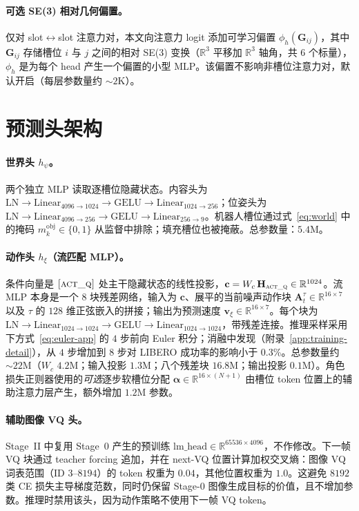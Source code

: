 \paragraph{可选 SE(3) 相对几何偏置。}
仅对 slot$\leftrightarrow$slot 注意力对，本文向注意力 logit 添加可学习偏置 $\phi_h(\mathbf{G}_{ij})$，其中 $\mathbf{G}_{ij}$ 存储槽位 $i$ 与 $j$ 之间的相对 SE(3) 变换（$\mathbb{R}^3$ 平移加 $\mathbb{R}^3$ 轴角，共 $6$ 个标量），$\phi_h$ 是为每个 head 产生一个偏置的小型 MLP。该偏置不影响非槽位注意力对，默认开启（每层参数量约 $\sim\!2$K）。

\section{预测头架构}
\label{app:heads}

\paragraph{世界头 $h_\psi$。}
两个独立 MLP 读取逐槽位隐藏状态。内容头为 $\mathrm{LN}\!\to\!\mathrm{Linear}_{4096\to 1024}\!\to\!\mathrm{GELU}\!\to\!\mathrm{Linear}_{1024\to 256}$；位姿头为 $\mathrm{LN}\!\to\!\mathrm{Linear}_{4096\to 256}\!\to\!\mathrm{GELU}\!\to\!\mathrm{Linear}_{256\to 9}$。机器人槽位通过式~\eqref{eq:world} 中的掩码 $m_k^\mathrm{obj}\!\in\!\{0,1\}$ 从监督中排除；填充槽位也被掩蔽。总参数量：$5.4$M。

\paragraph{动作头 $h_\xi$（流匹配 MLP）。}
条件向量是 $\textsc{[act\_q]}$ 处主干隐藏状态的线性投影，$\mathbf{c}=W_c\,\mathbf{H}_{\textsc{act\_q}}\in\mathbb{R}^{1024}$。流 MLP 本身是一个 $8$ 块残差网络，输入为 $\mathbf{c}$、展平的当前噪声动作块 $\mathbf{A}_t^\tau\in\mathbb{R}^{16\times 7}$ 以及 $\tau$ 的 $128$ 维正弦嵌入的拼接；输出为预测速度 $\mathbf{v}_\xi\in\mathbb{R}^{16\times 7}$。每个块为 $\mathrm{LN}\!\to\!\mathrm{Linear}_{1024\to 1024}\!\to\!\mathrm{GELU}\!\to\!\mathrm{Linear}_{1024\to 1024}$，带残差连接。推理采样采用下方式~\eqref{eq:euler-app} 的 $4$ 步前向 Euler 积分；消融中发现（附录~\ref{app:training-detail}），从 $4$ 步增加到 $8$ 步对 LIBERO 成功率的影响小于 $0.3$\%。总参数量约 $\sim\!22$M（$W_c$ $4.2$M；输入投影 $1.3$M；八个残差块 $16.8$M；输出投影 $0.1$M）。角色损失正则器使用的\emph{可选}逐步软槽位分配 $\boldsymbol{\alpha}\in\mathbb{R}^{16\times(N+1)}$ 由槽位 token 位置上的辅助注意力层产生，额外增加 $1.2$M 参数。

\paragraph{辅助图像 VQ 头。}
Stage~II 中复用 Stage~0 产生的预训练 $\mathrm{lm\_head}\in\mathbb{R}^{65536\times 4096}$，不作修改。下一帧 VQ 块通过 teacher forcing 追加，并在 next-VQ 位置计算加权交叉熵：图像 VQ 词表范围（ID $3$--$8194$）的 token 权重为 $0.04$，其他位置权重为 $1.0$。这避免 $8192$ 类 CE 损失主导梯度范数，同时仍保留 Stage-0 图像生成目标的价值，且不增加参数。推理时禁用该头，因为动作策略不使用下一帧 VQ token。


